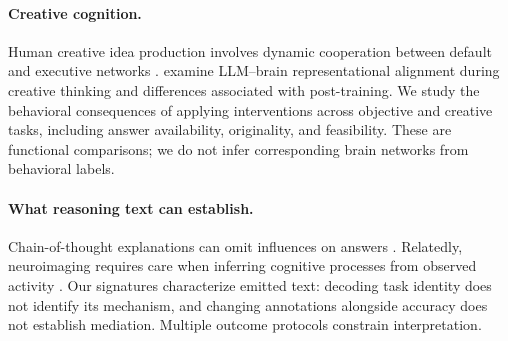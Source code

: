 \paragraph{Creative cognition.}
Human creative idea production involves dynamic cooperation between default and executive networks \citep{beaty2015creative}. \citet{ismayilzada2026creative} examine LLM--brain representational alignment during creative thinking and differences associated with post-training. We study the behavioral consequences of applying interventions across objective and creative tasks, including answer availability, originality, and feasibility. These are functional comparisons; we do not infer corresponding brain networks from behavioral labels.

\paragraph{What reasoning text can establish.}
Chain-of-thought explanations can omit influences on answers \citep{turpin2023faithfulness,chen2025faithfulness}. Relatedly, neuroimaging requires care when inferring cognitive processes from observed activity \citep{poldrack2006inference}. Our signatures characterize emitted text: decoding task identity does not identify its mechanism, and changing annotations alongside accuracy does not establish mediation. Multiple outcome protocols constrain interpretation.
